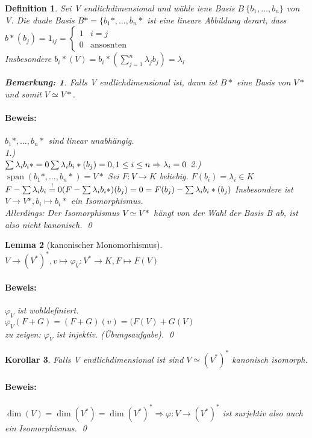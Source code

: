 \documentclass{report}
\newcommand{\lb}{\lambda}
\DeclareMathOperator{\Span}{span}
\theoremstyle{customrem}
\newtheorem*{bemerkung}{Bemerkung\textnormal:}
\theoremstyle{customdef}
\newtheorem{definition}{Definition}[chapter]
\newtheorem{lemma}[definition]{Lemma}
\newtheorem{korrolar}[definition]{Korollar}
\renewenvironment{proof}{\paragraph{Beweis: }}{\qed}
\theoremstyle{customenv}
\begin{document}
\begin{definition}
Sei V endlichdimensional und w\"ahle iene Basis \(B \ \{b_1, \dots, b_n\}\) von
V. Die duale Basis \(B* = \{b_1*, \dots, b_n*\) ist eine lineare Abbildung
derart, dass \(b*(b_j) = 1_{ij} = \begin{cases}
1 & i = j\\
0 & \text{ansosnten}
\end{cases}\)\\
Insbesondere \(b_i*(V) = b_i* (\sum_{j=1}^n \lb_j b_j) = \lb_i\)
\begin{bemerkung}
  Falls V endlichdimensional ist, dann ist \(B*\) eine Basis von \(V*\) und somit
  \(V \simeq V*\).
  \begin{proof}
    \(b_1*, \dots, b_n*\) sind linear unabh\"angig.\\
    1.)\\
    \(
      \sum \lb_i b_i* = 0\\
      \sum \lb_i b_i*(b_j) = 0, 1 \le i \le n
      \Rightarrow \lb_i = 0
    \)
    2.)\\
    \(
      \Span(b_1*, \dots, b_n*) = V*
    \)
    Sei \(F : V \to K\) beliebig. \(F(b_i) = \lb_i \in K\)\\
    \(
    F - \sum \lb_i b_i \overset{!}{=} 0\\
    (F - \sum \lb_i b_i*)(b_j) = 0 = F(b_j) - \sum \lb_i b_i*(b_j)\)
    Insbesondere ist \(V \to V*, b_i \mapsto b_i*\) ein Isomorphismus.\\
    Allerdings: Der Isomorphismus \(V \simeq V*\) h\"angt von der Wahl der Basis
    B ab, ist also nicht kanonisch.
  \end{proof}
\end{bemerkung}
\end{definition}

\begin{lemma}[kanonischer Monomorhismus]
 \(V \to (V^*)^*, v \mapsto \varphi_V : V^* \to K, F \mapsto F(V)\)\\
 \begin{proof}
    \(\varphi_V\) ist wohldefiniert.\\
    \(\varphi_V(F + G) = (F + G)(v) = (F(V) + G(V)\)\\
    zu zeigen: \(\varphi_V\) ist injektiv. (\"Ubungsaufgabe).
 \end{proof}
\end{lemma}

\begin{korrolar}
  Falls V endlichdimensional ist sind \(V \simeq (V^*)^*\) kanonisch isomorph.\\
  \begin{proof}
    \(\dim(V) = \dim(V^*) = \dim(V^*)^*
    \Rightarrow \varphi : V \to (V^*)^*\) ist surjektiv also auch ein
    Isomorphismus.
  \end{proof}
\end{korrolar}
\end{document}
